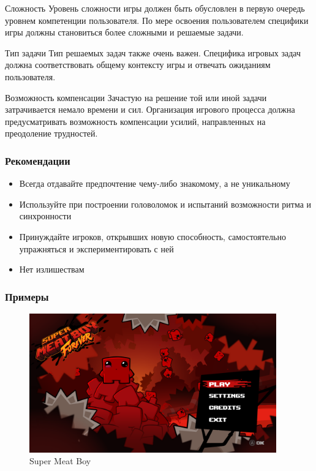 \documentclass[10pt]{beamer}
\begin{document}
\begin{frame}

\begin{block}{Сложность}
  Уровень сложности игры должен быть обусловлен в первую очередь уровнем компетенции пользователя. По мере освоения пользователем специфики игры должны становиться более сложными и решаемые задачи.
\end{block}

\begin{block}{Тип задачи}
  Тип решаемых задач также очень важен. Специфика игровых задач должна соответствовать общему контексту игры и отвечать ожиданиям пользователя.
\end{block}

\begin{block}{Возможность компенсации}
  Зачастую на решение той или иной задачи затрачивается немало времени и сил. Организация игрового процесса должна предусматривать возможность компенсации усилий, направленных на преодоление трудностей.
\end{block}

\end{frame}

\begin{frame}
\frametitle{Рекомендации}

\begin{block}{}
  \begin{itemize}
    \item Всегда отдавайте предпочтение чему-либо знакомому, а не уникальному
    \item Используйте при построении головоломок и испытаний возможности ритма и синхронности
    \item Принуждайте игроков, открывших новую способность, самостоятельно упражняться и экспериментировать с ней
    \item Нет излишествам
  \end{itemize}
\end{block}

\end{frame}

\begin{frame}
  \frametitle{Примеры}
  \centering
  \begin{figure}
    \includegraphics[width=0.95\textwidth]{res/img/superMeatBoy.png}
    \caption{Super Meat Boy}
  \end{figure}
\end{frame}
\end{document}
